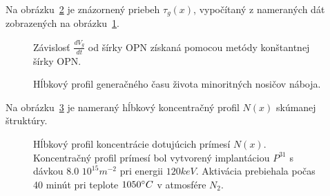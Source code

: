 Na obrázku~\ref{fig:3.6} je znázornený priebeh $\tau_g(x)$, vypočítaný
z nameraných dát zobrazených na obrázku~\ref{fig:3.5}.

\begin{figure}[h!]\centering
  
  \caption[Závislosť $\frac{dV_g}{dt}$ od šírky OPN získaná pomocou
    metódy konštantnej šírky OPN]{Závislosť $\frac{dV_g}{dt}$ od šírky
    OPN získaná pomocou metódy konštantnej šírky OPN.}\label{fig:3.5}
\end{figure}

\begin{figure}[h!]\centering
  
  \caption[Hĺbkový profil generačného času života minoritných nosičov
  náboja]{Hĺbkový profil generačného času života minoritných nosičov
  náboja.}\label{fig:3.6}
\end{figure}

Na obrázku~\ref{fig:3.7} je nameraný hĺbkový koncentračný profil
$N(x)$ skúmanej štruktúry.

\begin{figure}[h!]\centering
  
  \caption[Hĺbkový profil koncentrácie dotujúcich prímesí
  $N(x)$]{Hĺbkový profil koncentrácie dotujúcich prímesí
  $N(x)$. Koncentračný profil prímesí bol vytvorený implantáciou
  $P^{31}$ s dávkou $8.0$ $10^{15}m^{-2}$ pri energii $120 keV$.
  Aktivácia prebiehala počas 40 minút pri teplote $1050 \degree C$ v
  atmosfére $N_2$.}\label{fig:3.7}
\end{figure}


